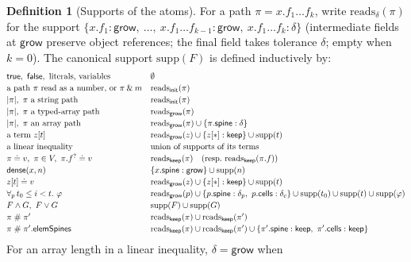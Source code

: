 \documentclass[10pt,a4paper]{article}
\theoremstyle{definition}
\newtheorem{definition}[theorem]{Definition}
\theoremstyle{remark}
\newcommand{\sep}{\mathrel{\#}}
\newcommand{\kw}[1]{\mathsf{#1}}
\newcommand{\keep}{\kw{keep}}
\newcommand{\init}{\kw{init}}
\newcommand{\grow}{\kw{grow}}
\newcommand{\dense}{\kw{dense}}
\newcommand{\len}[1]{|#1|}
\begin{document}
\begin{definition}[Supports of the atoms]\label{def:supports}
For a path $\pi=x.f_1\ldots f_k$, write $\mathrm{reads}_\delta(\pi)$ for
the support $\{x.f_1:\grow,\ \dots,\ x.f_1\ldots f_{k-1}:\grow,\ x.f_1\ldots f_k:\delta\}$
(intermediate fields at $\grow$ preserve object references; the final
field takes tolerance $\delta$; empty when $k=0$). The canonical support
$\mathrm{supp}(F)$ is defined inductively by:
{\small\begin{displaymath}
\begin{array}{@{}ll@{}}
\kw{true},\ \kw{false},\text{ literals, variables} & \emptyset\\[2pt]
\text{a path }\pi\text{ read as a number, or }\pi\mathbin{\&}m & \mathrm{reads}_{\init}(\pi)\\[2pt]
\len\pi,\ \pi\text{ a string path} & \mathrm{reads}_{\init}(\pi)\\[2pt]
\len\pi,\ \pi\text{ a typed-array path} & \mathrm{reads}_{\grow}(\pi)\\[2pt]
\len\pi,\ \pi\text{ an array path} & \mathrm{reads}_{\grow}(\pi)\cup\{\pi.\kw{spine}:\delta\}\\[2pt]
\text{a term }z[t] & \mathrm{reads}_{\grow}(z)\cup\{z[\ast]:\keep\}\cup\mathrm{supp}(t)\\[2pt]
\text{a linear inequality} & \text{union of supports of its terms}\\[2pt]
\pi\doteq v,\ \pi\in V,\ \pi.f^{?}\doteq v & \mathrm{reads}_{\keep}(\pi)\quad(\text{resp.\ }\mathrm{reads}_{\keep}(\pi.f))\\[2pt]
\dense(x,n) & \{x.\kw{spine}:\grow\}\cup\mathrm{supp}(n)\\[2pt]
z[t]\doteq v & \mathrm{reads}_{\grow}(z)\cup\{z[\ast]:\keep\}\cup\mathrm{supp}(t)\\[2pt]
\forall_{p}\, t_0\le i<t.\ \varphi & \mathrm{reads}_{\grow}(p)\cup\{p.\kw{spine}:\delta_p,\ p.\kw{cells}:\delta_c\}\cup\mathrm{supp}(t_0)\cup\mathrm{supp}(t)\cup\mathrm{supp}(\varphi)\\[2pt]
F\wedge G,\ F\vee G & \mathrm{supp}(F)\cup\mathrm{supp}(G)\\[2pt]
\pi\sep\pi' & \mathrm{reads}_{\keep}(\pi)\cup\mathrm{reads}_{\keep}(\pi')\\[2pt]
\pi\sep\pi'.\kw{elemSpines} & \mathrm{reads}_{\keep}(\pi)\cup\mathrm{reads}_{\keep}(\pi')\cup\{\pi'.\kw{spine}:\keep,\ \pi'.\kw{cells}:\keep\}
\end{array}
\end{displaymath}}
For an array length in a linear inequality, $\delta=\grow$ when

\end{definition}
\end{document}
